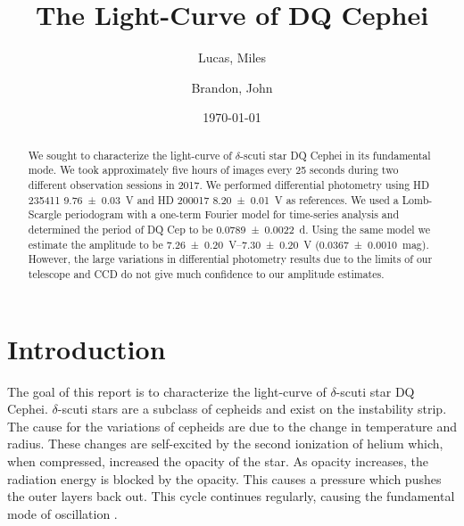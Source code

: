 \documentclass[%
aip,
jmp,
reprint,
floatfix,
nofootinbib
]{revtex4-1}
\begin{document}
	
	\title[Light-Curve of DQ Cephei]{The Light-Curve of DQ Cephei}
	
	\author{Lucas, Miles}
	\author{Brandon, John}
	
	\date{\today}
	
	

	\begin{abstract}
	We sought to characterize the light-curve of $\delta$-scuti star DQ Cephei in its fundamental mode. We took approximately five hours of images every 25 seconds during two different observation sessions in 2017. We performed differential photometry using HD 235411 \SI{9.76\pm.03}{V} and HD 200017 \SI{8.20\pm.01}{V} as references. We used a Lomb-Scargle periodogram with a one-term Fourier model for time-series analysis and determined the period of DQ Cep to be \SI{0.0789\pm.0022}{\day}. Using the same model we estimate the amplitude to be \SIrange{7.26\pm.20}{7.30\pm.20}{V} (\SI{.0367\pm.0010}{mag}). However, the large variations in differential photometry results due to the limits of our telescope and CCD do not give much confidence to our amplitude estimates. 
		
	\end{abstract}
	
	\maketitle
	

	\section{Introduction}
	
	The goal of this report is to characterize the light-curve of $\delta$-scuti star DQ Cephei. $\delta$-scuti stars are a subclass of cepheids and exist on the instability strip. The cause for the variations of cepheids are due to the change in temperature and radius. These changes are self-excited by the second ionization of helium \citep{1963ApJ...138..487C} which, when compressed, increased the opacity of the star. As opacity increases, the radiation energy is blocked by the opacity. This causes a pressure which pushes the outer layers back out. This cycle continues regularly, causing the fundamental mode of oscillation \citep{1935PASP...47..232F}. 
	
\end{document}
